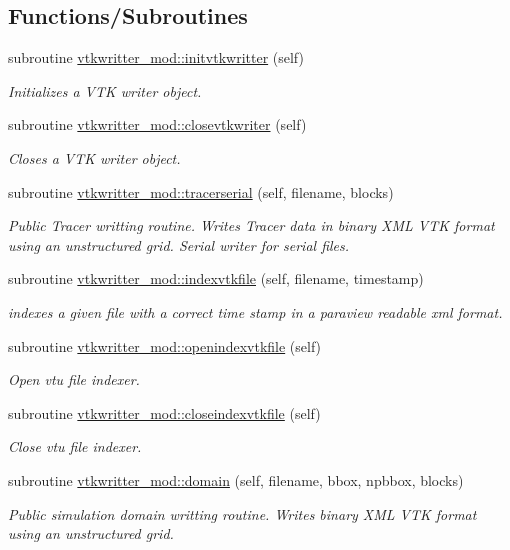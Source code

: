 \subsection*{Functions/\+Subroutines}
\begin{DoxyCompactItemize}
\item 
subroutine \mbox{\hyperlink{namespacevtkwritter__mod_abd35d591c8e15730a277b2d26deb83e8}{vtkwritter\+\_\+mod\+::initvtkwritter}} (self)
\begin{DoxyCompactList}\small\item\em Initializes a V\+TK writer object. \end{DoxyCompactList}\item 
subroutine \mbox{\hyperlink{namespacevtkwritter__mod_a13f1b870d2367704bcd4143a80b552f9}{vtkwritter\+\_\+mod\+::closevtkwriter}} (self)
\begin{DoxyCompactList}\small\item\em Closes a V\+TK writer object. \end{DoxyCompactList}\item 
subroutine \mbox{\hyperlink{namespacevtkwritter__mod_ac11e4d1d71141e6de89ba67508212ce0}{vtkwritter\+\_\+mod\+::tracerserial}} (self, filename, blocks)
\begin{DoxyCompactList}\small\item\em Public Tracer writting routine. Writes Tracer data in binary X\+ML V\+TK format using an unstructured grid. Serial writer for serial files. \end{DoxyCompactList}\item 
subroutine \mbox{\hyperlink{namespacevtkwritter__mod_a4c50b52b496bad6b053ffd5749da1582}{vtkwritter\+\_\+mod\+::indexvtkfile}} (self, filename, timestamp)
\begin{DoxyCompactList}\small\item\em indexes a given file with a correct time stamp in a paraview readable xml format. \end{DoxyCompactList}\item 
subroutine \mbox{\hyperlink{namespacevtkwritter__mod_a0c26bb22a8b7dd9f9da69309ad65d669}{vtkwritter\+\_\+mod\+::openindexvtkfile}} (self)
\begin{DoxyCompactList}\small\item\em Open vtu file indexer. \end{DoxyCompactList}\item 
subroutine \mbox{\hyperlink{namespacevtkwritter__mod_a6f9a731d9dee5651f85d4aeed3f3ea5d}{vtkwritter\+\_\+mod\+::closeindexvtkfile}} (self)
\begin{DoxyCompactList}\small\item\em Close vtu file indexer. \end{DoxyCompactList}\item 
subroutine \mbox{\hyperlink{namespacevtkwritter__mod_a9f44d9fd1c5da759c4f2d721d12a8181}{vtkwritter\+\_\+mod\+::domain}} (self, filename, bbox, npbbox, blocks)
\begin{DoxyCompactList}\small\item\em Public simulation domain writting routine. Writes binary X\+ML V\+TK format using an unstructured grid. \end{DoxyCompactList}\end{DoxyCompactItemize}
